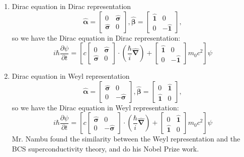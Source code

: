 \documentclass[12pt]{article}
\numberwithin{equation}{section}
\begin{document}
\begin{enumerate}
\item Dirac equation in Dirac representation
	\begin{equation}
	\hat{\mathbf{\alpha}}=\begin{bmatrix}0&\hat{\mathbf{\sigma}}\\\hat{\mathbf{\sigma}}&0\end{bmatrix},
	\hat{\mathbf{\beta}}=\begin{bmatrix}\hat{\mathbf{1}}&0\\0&-\hat{\mathbf{1}}\end{bmatrix},
	\end{equation}
	so we have the Dirac equation in Dirac representation:
	\begin{equation}
	i\hbar\frac{\partial \psi}{\partial t}=
	[c\begin{bmatrix}0&\hat{\mathbf{\sigma}}\\\hat{\mathbf{\sigma}}&0\end{bmatrix}\cdot(\frac{\hbar}{i}\hat{\mathbf{\nabla}})+\begin{bmatrix}\hat{\mathbf{1}}&0\\0&-\hat{\mathbf{1}}\end{bmatrix}m_0c^2]\psi
	\end{equation}
\item Dirac equation in Weyl representation
	\begin{equation}
	\hat{\mathbf{\alpha}}=\begin{bmatrix}\hat{\mathbf{\sigma}}&0\\0&-\hat{\mathbf{\sigma}}\end{bmatrix},
	\hat{\mathbf{\beta}}=\begin{bmatrix}0&\hat{\mathbf{1}}\\\hat{\mathbf{1}}&0\end{bmatrix},
	\end{equation}
	so we have the Dirac equation in Weyl representation:
	\begin{equation}
	i\hbar\frac{\partial \psi}{\partial t}=
	[c\begin{bmatrix}\hat{\mathbf{\sigma}}&0\\0&-\hat{\mathbf{\sigma}}\end{bmatrix}\cdot(\frac{\hbar}{i}\hat{\mathbf{\nabla}})+\begin{bmatrix}0&\hat{\mathbf{1}}\\\hat{\mathbf{1}}&0\end{bmatrix}m_0c^2]\psi
	\end{equation}
	Mr. Nambu found the similarity between the Weyl representation and the BCS superconductivity theory, and do his Nobel Prize work.
\end{enumerate}
\end{document}
